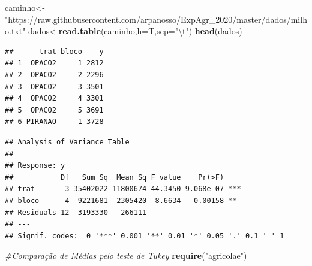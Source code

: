 \documentclass[
]{book}
\newenvironment{Shaded}{\begin{snugshade}}{\end{snugshade}}
\newcommand{\CharTok}[1]{\textcolor[rgb]{0.31,0.60,0.02}{#1}}
\newcommand{\CommentTok}[1]{\textcolor[rgb]{0.56,0.35,0.01}{\textit{#1}}}
\newcommand{\DataTypeTok}[1]{\textcolor[rgb]{0.13,0.29,0.53}{#1}}
\newcommand{\KeywordTok}[1]{\textcolor[rgb]{0.13,0.29,0.53}{\textbf{#1}}}
\newcommand{\NormalTok}[1]{#1}
\newcommand{\OperatorTok}[1]{\textcolor[rgb]{0.81,0.36,0.00}{\textbf{#1}}}
\newcommand{\StringTok}[1]{\textcolor[rgb]{0.31,0.60,0.02}{#1}}
\begin{document}
\begin{Shaded}
\begin{Highlighting}[]
\NormalTok{caminho<-}\StringTok{"https://raw.githubusercontent.com/arpanosso/ExpAgr_2020/master/dados/milho.txt"}
\NormalTok{dados<-}\KeywordTok{read.table}\NormalTok{(caminho,}\DataTypeTok{h=}\NormalTok{T,}\DataTypeTok{sep=}\StringTok{"}\CharTok{\textbackslash{}t}\StringTok{"}\NormalTok{)}
\KeywordTok{head}\NormalTok{(dados)}
\end{Highlighting}
\end{Shaded}

\begin{verbatim}
##      trat bloco    y
## 1  OPACO2     1 2812
## 2  OPACO2     2 2296
## 3  OPACO2     3 3501
## 4  OPACO2     4 3301
## 5  OPACO2     5 3691
## 6 PIRANAO     1 3728
\end{verbatim}

\begin{Shaded}
\end{Shaded}

\begin{verbatim}
## Analysis of Variance Table
## 
## Response: y
##           Df   Sum Sq  Mean Sq F value    Pr(>F)    
## trat       3 35402022 11800674 44.3450 9.068e-07 ***
## bloco      4  9221681  2305420  8.6634   0.00158 ** 
## Residuals 12  3193330   266111                      
## ---
## Signif. codes:  0 '***' 0.001 '**' 0.01 '*' 0.05 '.' 0.1 ' ' 1
\end{verbatim}

\begin{Shaded}
\begin{Highlighting}[]
\CommentTok{#Comparação de Médias pelo teste de Tukey}
\KeywordTok{require}\NormalTok{(}\StringTok{"agricolae"}\NormalTok{)}
\end{Highlighting}
\end{Shaded}
\end{document}
